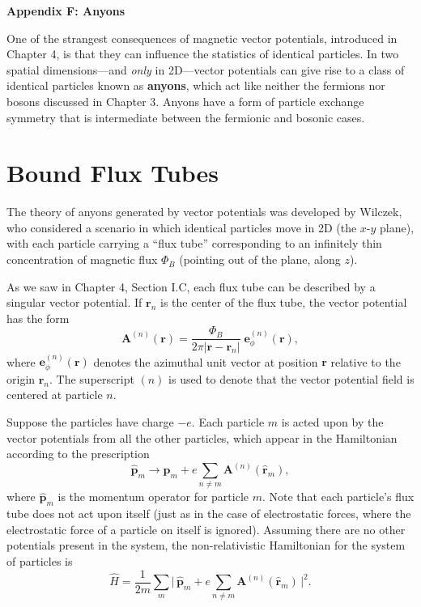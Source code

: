 \documentclass[pra,12pt]{revtex4}
\begin{document}
\begin{center}
{\large \textbf{Appendix F: Anyons}}
\end{center}

One of the strangest consequences of magnetic vector potentials,
introduced in Chapter 4, is that they can influence the statistics of
identical particles.  In two spatial dimensions---and \textit{only} in
2D---vector potentials can give rise to a class of identical particles
known as \textbf{anyons}, which act like neither the fermions nor
bosons discussed in Chapter 3.  Anyons have a form of particle
exchange symmetry that is intermediate between the fermionic and
bosonic cases.

\section{Bound Flux Tubes}

The theory of anyons generated by vector potentials was developed by
Wilczek, who considered a scenario in which identical particles move
in 2D (the $x$-$y$ plane), with each particle carrying a ``flux tube''
corresponding to an infinitely thin concentration of magnetic flux
$\Phi_B$ (pointing out of the plane, along $z$).

As we saw in Chapter 4, Section I.C, each flux tube can be described
by a singular vector potential.  If $\mathbf{r}_n$ is the center of
the flux tube, the vector potential has the form
\begin{equation}
  \mathbf{A}^{(n)}(\mathbf{r}) = \frac{\Phi_B}{2\pi
    |\mathbf{r}-\mathbf{r}_n|} \; \mathbf{e}_\phi^{(n)}(\mathbf{r}),
  \label{Asolenoid}
\end{equation}
where $\mathbf{e}_\phi^{(n)}(\mathbf{r})$ denotes the azimuthal unit
vector at position $\mathbf{r}$ relative to the origin $\mathbf{r}_n$.
The superscript $(n)$ is used to denote that the vector potential
field is centered at particle $n$.

Suppose the particles have charge $-e$.  Each particle $m$ is acted
upon by the vector potentials from all the other particles, which
appear in the Hamiltonian according to the prescription
\begin{equation}
  \hat{\mathbf{p}}_m \rightarrow \hat{\mathbf{p}}_m
  + e \sum_{n \ne m} \mathbf{A}^{(n)}(\hat{\mathbf{r}}_m),
\end{equation}
where $\hat{\mathbf{p}}_m$ is the momentum operator for particle $m$.
Note that each particle's flux tube does not act upon itself (just as
in the case of electrostatic forces, where the electrostatic force of
a particle on itself is ignored).  Assuming there are no other
potentials present in the system, the non-relativistic Hamiltonian for
the system of particles is
\begin{equation}
  \hat{H} = \frac{1}{2m} \sum_m \Big| \,\hat{\mathbf{p}}_m
  + e \sum_{n \ne m} \mathbf{A}^{(n)}(\hat{\mathbf{r}}_m)\,\Big|^2.
\end{equation}
\end{document}
